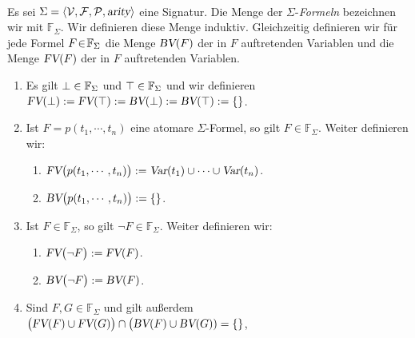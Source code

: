 \begin{Definition} 
\label{praedikaten-formel} \hspace*{\fill} 
  \\
Es sei $\Sigma = \langle \mathcal{V}, \mathcal{F}, \mathcal{P}, \textsl{arity} \rangle$ eine Signatur.
    Die Menge der {\color{blue}$\Sigma$-\emph{Formeln}} bezeichnen wir mit $\mathbb{F}_\Sigma$.
    Wir definieren diese Menge induktiv.
    Gleichzeitig definieren wir für jede Formel $F\!\in\! \mathbb{F}_\Sigma$ die Menge $\textsl{BV}(F)$ der in $F$ 
     auftretenden Variablen und die Menge $\textsl{FV}(F)$ der in $F$  auftretenden Variablen.
    \begin{enumerate}
    \item Es gilt $\bot \in \mathbb{F}_\Sigma$ und $\top \in \mathbb{F}_\Sigma$ und wir definieren \\[0.2cm]
          \hspace*{1.3cm} $\textsl{FV}(\bot) := \textsl{FV}(\top) := \textsl{BV}(\bot) := \textsl{BV}(\top) := \{\}$.
    \item Ist $F = p(t_1,\cdots,t_n)$ eine atomare $\Sigma$-Formel, so gilt $F \in \mathbb{F}_\Sigma$.  Weiter definieren wir:
          \begin{enumerate}
          \item $\textsl{FV}\bigl(p(t_1,\cdots,t_n) \bigr) := \textsl{Var}(t_1) \cup \cdots \cup \textsl{Var}(t_n)$.
          \item $\textsl{BV}\bigl(p(t_1,\cdots,t_n) \bigr) := \{\}$.
          \end{enumerate}
    \item Ist $F \in \mathbb{F}_\Sigma$, so gilt $\neg F \in \mathbb{F}_\Sigma$. Weiter definieren wir:
          \begin{enumerate}
          \item $\textsl{FV}\bigl( \neg F \bigr) := \textsl{FV}(F)$.
          \item $\textsl{BV}\bigl( \neg F \bigr) := \textsl{BV}(F)$.
          \end{enumerate}
    \item Sind $F, G \in \mathbb{F}_\Sigma$ und gilt außerdem \\[0.2cm]
          \hspace*{1.3cm}
          $\bigl(\textsl{FV}(F) \cup \textsl{FV}(G)\bigr) \cap \bigl(\textsl{BV}(F) \cup \textsl{BV}(G)) = \{\}$,

\end{enumerate}
\end{Definition}
